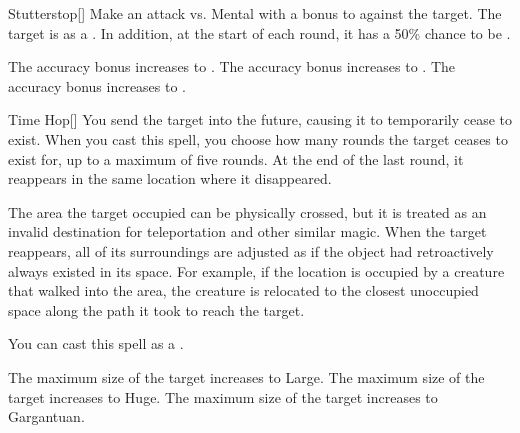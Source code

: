 \lowercase{\hypertarget{spell:Stutterstop}{}}\label{spell:Stutterstop}
\begin{freeability}[Rank 2]{\hypertarget{spell:Stutterstop}{Stutterstop}}[]
Make an attack vs. Mental with a  bonus to  against the target.
\hit The target is  as a .
In addition, at the start of each round, it has a 50\% chance to be  .

\rankline
{} The accuracy bonus increases to .
 The accuracy bonus increases to .
 The accuracy bonus increases to .

\end{freeability}
\vspace{0.25em}



\lowercase{\hypertarget{spell:Time Hop}{}}\label{spell:Time Hop}
\begin{freeability}[Rank 2]{\hypertarget{spell:Time Hop}{Time Hop}}[]
You send the target into the future, causing it to temporarily cease to exist.
When you cast this spell, you choose how many rounds the target ceases to exist for, up to a maximum of five rounds.
At the end of the last round, it reappears in the same location where it disappeared.

The area the target occupied can be physically crossed, but it is treated as an invalid destination for teleportation and other similar magic.
When the target reappears, all of its surroundings are adjusted as if the object had retroactively always existed in its space.
For example, if the location is occupied by a creature that walked into the area, the creature is relocated to the closest unoccupied space along the path it took to reach the target.

You can cast this spell as a .

\rankline
{} The maximum size of the target increases to Large.
 The maximum size of the target increases to Huge.
 The maximum size of the target increases to Gargantuan.

\end{freeability}
\vspace{0.25em}



